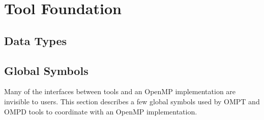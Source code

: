 \section{Tool Foundation}
\subsection{Data Types}



\subsection{Global Symbols}
Many of the interfaces between tools and an OpenMP implementation are invisible to users. This section describes
a few global symbols used by OMPT and OMPD tools to coordinate with an OpenMP implementation.


